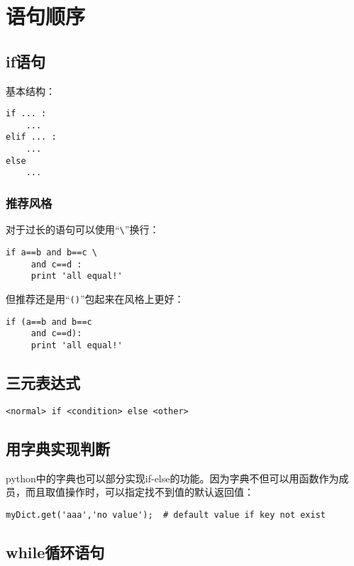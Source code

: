 
\chapter{语句顺序}

	\section{if语句}

		基本结构：
		
\begin{lstlisting}
if ... :
	...
elif ... :
	...
else
	...
\end{lstlisting}

		\subsection{推荐风格}

			对于过长的语句可以使用“\verb|\|”换行：

\begin{lstlisting}
if a==b and b==c \
	 and c==d :
	 print 'all equal!'
\end{lstlisting}

			但推荐还是用“\verb|()|”包起来在风格上更好：

\begin{lstlisting}
if (a==b and b==c
	 and c==d):
	 print 'all equal!'
\end{lstlisting}

	\section{三元表达式}

\begin{lstlisting}
<normal> if <condition> else <other>
\end{lstlisting}
	

	\section{用字典实现判断}

		python中的字典也可以部分实现if-else的功能。因为字典不但可以用函数作为成员，而且取值操作时，可以指定找不到值的默认返回值：

\begin{lstlisting}
myDict.get('aaa','no value');  # default value if key not exist
\end{lstlisting}

	\section{while循环语句}


